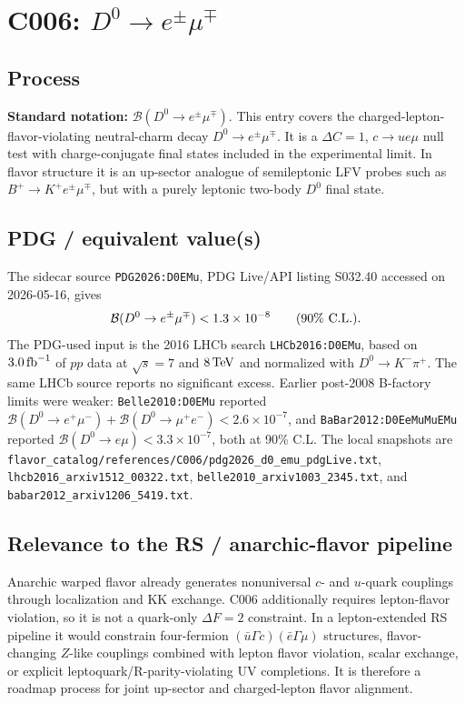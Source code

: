 
\section{C006: \texorpdfstring{\(D^0\to e^\pm\mu^\mp\)}{D0 -> e mu}}

\subsection*{Process}
\textbf{Standard notation:}
\(\mathcal{B}(D^0\to e^\pm\mu^\mp)\).
This entry covers the charged-lepton-flavor-violating neutral-charm decay
\(D^0\to e^\pm\mu^\mp\).  It is a \(\Delta C=1\), \(c\to u e\mu\)
null test with charge-conjugate final states included in the experimental
limit.  In flavor structure it is an up-sector analogue of semileptonic LFV
probes such as \(B^+\to K^+ e^\pm\mu^\mp\), but with a purely leptonic
two-body \(D^0\) final state.

\subsection*{PDG / equivalent value(s)}
The sidecar source \texttt{PDG2026:D0EMu}, PDG Live/API listing S032.40
accessed on 2026-05-16, gives
\[
  \mathcal{B}(D^0\to e^\pm\mu^\mp) < 1.3\times 10^{-8}
  \qquad (90\%~{\rm C.L.}).
\]
The PDG-used input is the 2016 LHCb search
\texttt{LHCb2016:D0EMu}, based on \(3.0\,{\rm fb}^{-1}\) of \(pp\) data
at \(\sqrt{s}=7\) and \(8\,{\rm TeV}\) and normalized with
\(D^0\to K^-\pi^+\).  The same LHCb source reports no significant excess.
Earlier post-2008 B-factory limits were weaker:
\texttt{Belle2010:D0EMu} reported
\(\mathcal{B}(D^0\to e^+\mu^-)+\mathcal{B}(D^0\to\mu^+e^-)<2.6\times10^{-7}\),
and \texttt{BaBar2012:D0EeMuMuEMu} reported
\(\mathcal{B}(D^0\to e\mu)<3.3\times10^{-7}\), both at 90\% C.L.  The
local snapshots are
\texttt{flavor\_catalog/references/C006/pdg2026\_d0\_emu\_pdgLive.txt},
\texttt{lhcb2016\_arxiv1512\_00322.txt},
\texttt{belle2010\_arxiv1003\_2345.txt}, and
\texttt{babar2012\_arxiv1206\_5419.txt}.

\subsection*{Relevance to the RS / anarchic-flavor pipeline}
Anarchic warped flavor already generates nonuniversal \(c\)- and \(u\)-quark
couplings through localization and KK exchange.  C006 additionally requires
lepton-flavor violation, so it is not a quark-only \(\Delta F=2\) constraint.
In a lepton-extended RS pipeline it would constrain four-fermion
\((\bar u\Gamma c)(\bar e\Gamma\mu)\) structures, flavor-changing \(Z\)-like
couplings combined with lepton flavor violation, scalar exchange, or explicit
leptoquark/R-parity-violating UV completions.  It is therefore a roadmap
process for joint up-sector and charged-lepton flavor alignment.

